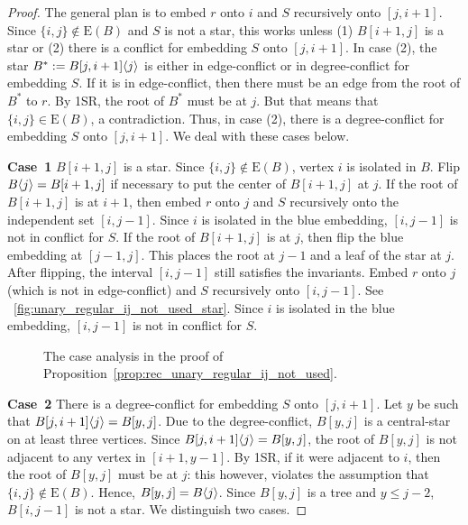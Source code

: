 \documentclass[11pt,a4paper,colorlinks=true,urlcolor=blue,citecolor=red]{article}
\theoremstyle{plain}
\newcommand{\case}[1]{\par\vspace{.5\baselineskip}\noindent\textbf{\sffamily Case~#1}}
\newcommand{\EB}{\mathrm{E}(B)}
\begin{document}
\begin{proof}
  The general plan is to embed $r$ onto $i$ and $S$ recursively onto
  $[j,i+1]$. Since $\{i,j\}\not\in\EB$ and $S$ is not a star,
  this works unless (1) $B[i+1,j]$ is a star or (2) there is a
  conflict for embedding $S$ onto $[j,i+1]$. In case (2), the star
  $B^*:=B{[j,i+1]}\langle{j}\rangle$ is either in edge-conflict or in
  degree-conflict for embedding $S$. If it is in edge-conflict, then
  there must be an edge from the root of $B^*$ to $r$. By 1SR, the root
  of $B^*$ must be at $j$. But that means that
  $\{i,j\}\in\EB$, a contradiction. Thus, in case (2), there
  is a degree-conflict for embedding $S$ onto $[j,i+1]$. We deal with
  these cases below.

  \case{1} $B[i+1,j]$ is a star. Since $\{i,j\}\not\in\EB$, vertex $i$
  is isolated in $B$. Flip $B\langle{j}\rangle=B[i+1,j]$ if necessary to put the
  center of $B[i+1,j]$ at $j$. If the root of $B[i+1,j]$ is at $i+1$,
  then embed $r$ onto $j$ and $S$ recursively onto the independent set
  $[i,j-1]$. Since $i$ is isolated in the blue embedding, $[i,j-1]$ is
  not in conflict for $S$. If the root of $B[i+1,j]$ is at $j$, then
  flip the blue embedding at $[j-1,j]$. This places the root at $j-1$
  and a leaf of the star at $j$. After flipping, the interval $[i,j-1]$
  still satisfies the invariants. Embed $r$ onto $j$ (which is not in
  edge-conflict) and $S$ recursively onto $[i,j-1]$. See
  \figurename~\ref{fig:unary_regular_ij_not_used_star}. Since $i$ is
  isolated in the blue embedding, $[i,j-1]$ is not in conflict for $S$.

  \begin{figure}[b]
    \centering
    \hfil
    \hfil
    \hfil
    \hfil
    \caption{The case analysis in the proof of
      Proposition~\ref{prop:rec_unary_regular_ij_not_used}.}
    \label{fig:unary_regular_ij_not_uses}
  \end{figure}

  \case{2} There is a degree-conflict for embedding $S$ onto $[j,i+1]$.
  Let $y$ be such that $B{[j,i+1]}\langle{j}\rangle=B[y,j]$. Due to the
  degree-conflict, $B[y,j]$ is a central-star on at least three
  vertices. Since $B{[j,i+1]}\langle{j}\rangle=B[y,j]$, the root of $B[y,j]$ is
  not adjacent to any vertex in $[i+1,y-1]$. By 1SR, if it were adjacent
  to $i$, then the root of $B[y,j]$ must be at $j$: this however,
  violates the assumption that $\{i,j\}\not\in\EB$. Hence,
  $B[y,j]=B\langle{j}\rangle$. Since $B[y,j]$ is a tree and $y\leq j-2$,
  $B[i,j-1]$ is not a star. We distinguish two cases.


\end{proof}
\end{document}
